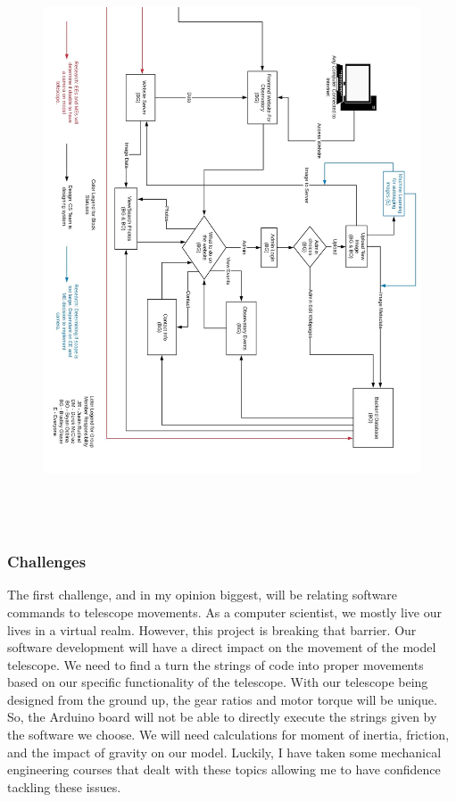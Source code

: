 \documentclass[12pt]{report}
\begin{document}
\newpage

\begin{figure}[h]
	\centering
	\includegraphics[width=1.00\linewidth, height=17.0cm]{blockpt1}
\end{figure}

\newpage

\subsubsection*{Challenges}

The first challenge, and in my opinion biggest, will be relating software commands to telescope movements. As a computer scientist, we mostly live our lives in a virtual realm. However, this project is breaking that barrier. Our software development will have a direct impact on the movement of the model telescope. We need to find a turn the strings of code into proper movements based on our specific functionality of the telescope. With our telescope being designed from the ground up, the gear ratios and motor torque will be unique. So, the Arduino board will not be able to directly execute the strings given by the software we choose. We will need calculations for moment of inertia, friction, and the impact of gravity on our model. Luckily, I have taken some mechanical engineering courses that dealt with these topics allowing me to have confidence tackling these issues.
\end{document}
